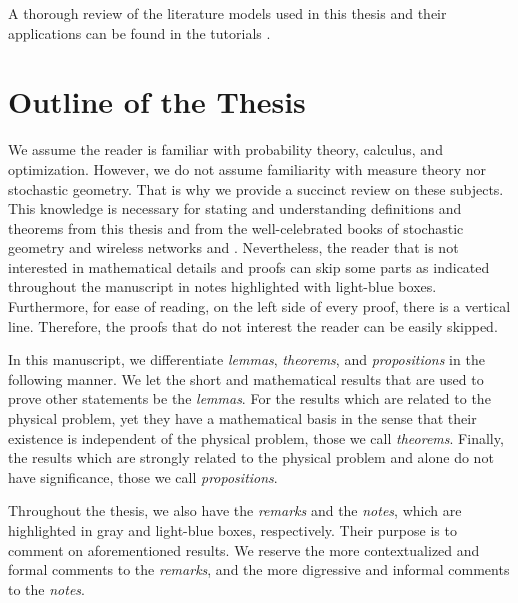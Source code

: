 A thorough review of the literature models used in this thesis and their applications can be found in the tutorials \cite{haenggi2021stochastic, cardieri2010modeling}.

\section{Outline of the Thesis}

We assume the reader is familiar with probability theory, calculus, and optimization.
%
However, we do not assume familiarity with measure theory nor stochastic geometry. That is why we provide a succinct review on these subjects.
%
This knowledge is necessary for stating and understanding definitions and theorems from this thesis and from the well-celebrated books of stochastic geometry and wireless networks \cite{baccelli2010stochastic} and \cite{haenggi2012stochastic}.
%
Nevertheless, the reader that is not interested in mathematical details and proofs can skip some parts as indicated throughout the manuscript in notes highlighted with light-blue boxes.
%
Furthermore, for ease of reading, on the left side of every proof, there is a vertical line. Therefore, the proofs that do not interest the reader can be easily skipped.

In this manuscript, we differentiate \textit{lemmas}, \textit{theorems}, and \textit{propositions} in the following manner.
%
We let the short and mathematical results that are used to prove other statements be the \textit{lemmas}.
%
For the results which are related to the physical problem, yet they have a mathematical basis in the sense that their existence is independent of the physical problem, those we call \textit{theorems}.
%
Finally, the results which are strongly related to the physical problem and alone do not have significance, those we call \textit{propositions}.

Throughout the thesis, we also have the \textit{remarks} and the \textit{notes}, which are highlighted in gray and light-blue boxes, respectively.
%
Their purpose is to comment on aforementioned results.
%
We reserve the more contextualized and formal comments to the \textit{remarks}, and the more digressive and informal comments to the \textit{notes}.


